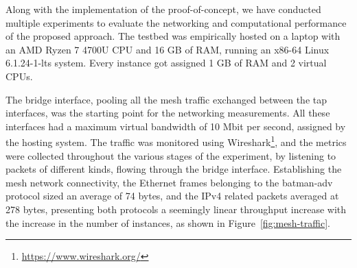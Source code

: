 Along with the implementation of the proof-of-concept, we have conducted multiple experiments to evaluate the networking and computational performance of the proposed approach. The testbed was empirically hosted on a laptop with an AMD Ryzen 7 4700U CPU and 16 GB of RAM, running an x86-64 Linux 6.1.24-1-lts system. Every instance got assigned 1 GB of RAM and 2 virtual CPUs. 

The bridge interface, pooling all the mesh traffic exchanged between the tap interfaces, was the starting point for the networking measurements. All these interfaces had a maximum virtual bandwidth of 10 Mbit per second, assigned by the hosting system. The traffic was monitored using Wireshark\footnote{\url{https://www.wireshark.org/}}, and the metrics were collected throughout the various stages of the experiment, by listening to packets of different kinds, flowing through the bridge interface. Establishing the mesh network connectivity, the Ethernet frames belonging to the batman-adv protocol sized an average of 74 bytes, and the IPv4 related packets averaged at 278 bytes, presenting both protocols a seemingly linear throughput increase with the increase in the number of instances, as shown in Figure~\ref{fig:mesh-traffic}. 

